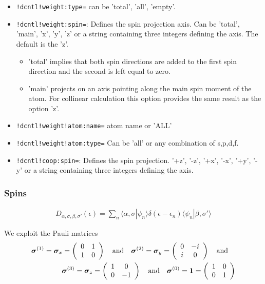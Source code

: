 \documentclass[11pt,a4paper]{report}
\begin{document}
\begin{itemize}
  \item \verb|!dcntl!weight:type=| can be 'total', 'all', 'empty'.
%
  \item \verb|!dcntl!weight:spin=|: Defines the spin projection axis.
    Can be 'total', 'main', 'x', 'y', 'z' or a string containing three
    integers defining the axis.  The default is the 'z'.
  \begin{itemize}
    \item 'total' implies that both spin directions are added to the
      first spin direction and the second is left equal to zero.
    \item 'main' projects on an axis pointing along the main spin
      moment of the atom. For collinear calculation this option
      provides the same result as the option  'z'.
  \end{itemize}
%
  \item \verb|!dcntl!weight!atom:name=| atom name or 'ALL'
%
  \item \verb|!dcntl!weight!atom:type=| Can be 'all' or any combination
    of s,p,d,f.
   
  \item \verb|!dcntl!coop:spin=|: Defines the spin projection.
     '+z', '-z', '+x', '-x', '+y', '-y' or a string containing three
    integers defining the axis.  
\end{itemize}

\subsubsection{Spins}
\begin{eqnarray}
D_{\alpha,\sigma,\beta,\sigma'}(\epsilon)
=\sum_n \langle\alpha,\sigma|\psi_n\rangle \delta(\epsilon-\epsilon_n)
\langle\psi_n|\beta,\sigma'\rangle
\end{eqnarray}

We exploit the Pauli matrices
\begin{eqnarray}
\bm{\sigma}^{(1)}=\bm{\sigma}_x
=\left(\begin{array}{cc} 0&1\\1&0\end{array}\right)
\quad\text{and}\quad
\bm{\sigma}^{(2)}=\bm{\sigma}_y
=\left(\begin{array}{cc} 0&-i\\i&0\end{array}\right)
\quad\text{and}\quad
\nonumber\\
\bm{\sigma}^{(3)}=\bm{\sigma}_z
=\left(\begin{array}{cc} 1&0\\0&-1\end{array}\right)
\quad\text{and}\quad
\bm{\sigma}^{(0)}=\bm{1}
=\left(\begin{array}{cc} 1&0\\0&1\end{array}\right)
\end{eqnarray}
\end{document}
